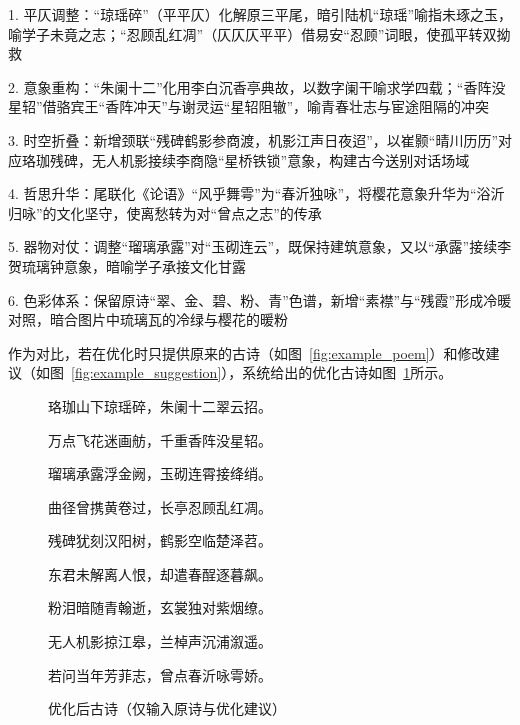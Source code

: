 \begin{tcolorbox}[
  colback=white,
  colframe=black,
  boxrule=1pt,
  arc=0mm,
  ]
  \kaishu
  1. 平仄调整：“琼瑶碎”（平平仄）化解原三平尾，暗引陆机“琼瑶”喻指未琢之玉，喻学子未竟之志；“忍顾乱红凋”（仄仄仄平平）借易安“忍顾”词眼，使孤平转双拗救\par
  2. 意象重构：“朱阑十二”化用李白沉香亭典故，以数字阑干喻求学四载；“香阵没星轺”借骆宾王“香阵冲天”与谢灵运“星轺阻辙”，喻青春壮志与宦途阻隔的冲突\par
  3. 时空折叠：新增颈联“残碑鹤影参商渡，机影江声日夜迢”，以崔颢“晴川历历”对应珞珈残碑，无人机影接续李商隐“星桥铁锁”意象，构建古今送别对话场域\par
  4. 哲思升华：尾联化《论语》“风乎舞雩”为“春沂独咏”，将樱花意象升华为“浴沂归咏”的文化坚守，使离愁转为对“曾点之志”的传承\par
  5. 器物对仗：调整“瑠璃承露”对“玉砌连云”，既保持建筑意象，又以“承露”接续李贺琉璃钟意象，暗喻学子承接文化甘露\par
  6. 色彩体系：保留原诗“翠、金、碧、粉、青”色谱，新增“素襟”与“残霞”形成冷暖对照，暗合图片中琉璃瓦的冷绿与樱花的暖粉\par

\end{tcolorbox}

作为对比，若在优化时只提供原来的古诗（如图~\ref{fig:example_poem}）和修改建议（如图~\ref{fig:example_suggestion}），系统给出的优化古诗如图~\ref{fig:example_poem_optimized_bad}所示。

\begin{figure}[ht]
  \centering
  \begin{tcolorbox}[
      colback=white,
      colframe=black,
      boxrule=1pt,
      arc=0mm,
      width=0.6\linewidth,  %
      ]
      \kaishu
      \centering
      珞珈山下琼瑶碎，朱阑十二翠云招。\par
      万点飞花迷画舫，千重香阵没星轺。\par
      瑠璃承露浮金阙，玉砌连霄接绛绡。\par
      曲径曾携黄卷过，长亭忍顾乱红凋。\par
      残碑犹刻汉阳树，鹤影空临楚泽苕。\par
      东君未解离人恨，却遣春酲逐暮飙。\par
      粉泪暗随青翰逝，玄裳独对紫烟缭。\par
      无人机影掠江皋，兰棹声沉浦溆遥。\par
      若问当年芳菲志，曾点春沂咏雩娇。
  \end{tcolorbox}
  \caption{优化后古诗（仅输入原诗与优化建议）}
  \label{fig:example_poem_optimized_bad}
\end{figure}

